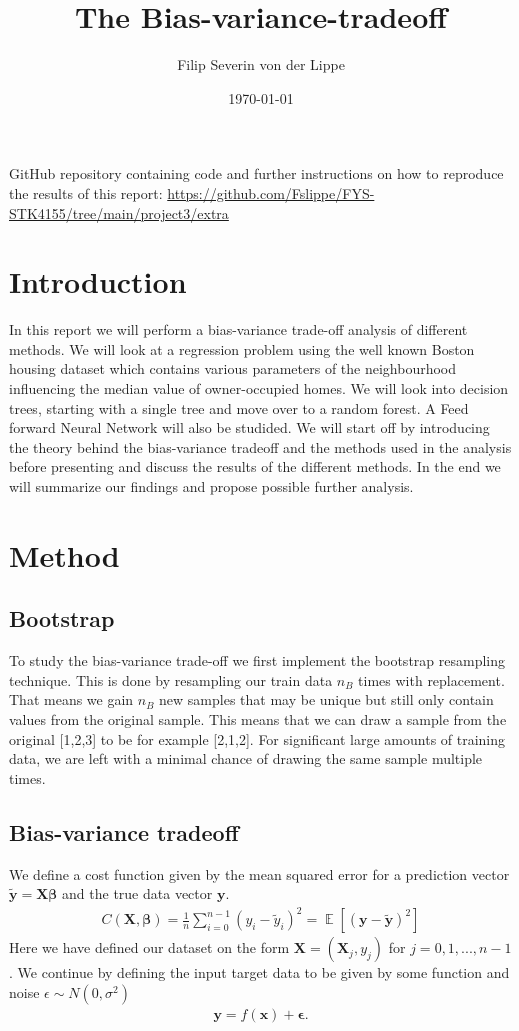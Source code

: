 \documentclass[11pt]{article}
\title{The Bias-variance-tradeoff}
\author{Filip Severin von der Lippe}
\date{\today}
\DeclareMathOperator*{\E}{\mathbb{E}}
\begin{document}
\maketitle
GitHub repository containing code and further instructions on how to reproduce the results of this report: \url{https://github.com/Fslippe/FYS-STK4155/tree/main/project3/extra}

\section{Introduction}
In this report we will perform a bias-variance trade-off analysis of different methods. We will look at a regression problem using the well known Boston housing dataset which contains various parameters of the neighbourhood influencing the median value of owner-occupied homes. We will look into decision trees, starting with a single tree and move over to a random forest. A Feed forward Neural Network will also be studided. We will start off by introducing the theory behind the bias-variance tradeoff and the methods used in the analysis before presenting and discuss the results of the different methods. In the end we will summarize our findings and propose possible further analysis.

\section{Method}
\subsection*{Bootstrap}

To study the bias-variance trade-off we first implement the bootstrap resampling technique. This is done by resampling our train data $n_B$ times with replacement. That means we gain $n_B$ new samples that may be unique but still only contain values from the original sample. This means that we can draw a sample from the original [1,2,3] to be for example [2,1,2]. For significant large amounts of training data, we are left with a minimal chance of drawing the same sample multiple times.

\subsection*{Bias-variance tradeoff}
We define a cost function given by the mean squared error for a prediction vector $\tilde{\boldsymbol{y}}= \boldsymbol{X} \boldsymbol{\beta}$ and the true data vector $\boldsymbol{y}$.
\begin{align*}
    C(\boldsymbol{X}, \boldsymbol{\beta}) = \frac{1 }{n }\sum_ {i=0}^{n-1}(y_i - \tilde{y}_i)^2 = \E[(\boldsymbol{y}- \boldsymbol{\tilde{y}})^2]
\end{align*}
Here we have defined our dataset on the form $\boldsymbol{X} = (\boldsymbol{X}_j, y_j)$ for $j= 0, 1, ..., n-1$.
We continue by defining the input target data to be given by some function and noise $\epsilon\sim N(0, \sigma^2)$
\begin{align*}
    \boldsymbol{y} = f(\boldsymbol{x}) + \boldsymbol{\epsilon}.
\end{align*}
\end{document}

